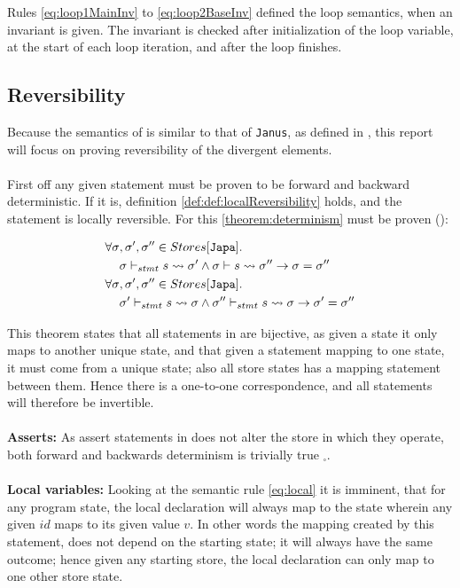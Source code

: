 Rules \eqref{eq:loop1MainInv} to \eqref{eq:loop2BaseInv} defined the loop semantics, when an
invariant is given. The invariant is checked after initialization of the loop variable, at
the start of each loop iteration, and after the loop finishes.

\subsection{Reversibility} \label{subsec:reversibility}
Because the semantics of \lan is similar to that of \texttt{Janus}, as defined in \cite{janus},
this report will focus on proving reversibility of the divergent elements.
\\
\\
First off any given statement must be proven to be forward and backward deterministic. If it is,
definition \autoref{def:def:localReversibility} holds, and the statement is locally reversible.
For this \autoref{theorem:determinism} must be proven (\cite{janus}):

\begin{theorem} \label{theorem:determinism}
    \begin{align*}
        \forall \sigma&, \sigma', \sigma''\in Stores[\texttt{Japa}]. \\
        &\sigma \vdash_{stmt} s \leadsto \sigma' \land \sigma \vdash s \leadsto \sigma''
            \rightarrow \sigma = \sigma'' \\
        \forall \sigma&, \sigma', \sigma''\in Stores[\texttt{Japa}]. \\
        &\sigma' \vdash_{stmt} s \leadsto \sigma \land \sigma'' \vdash_{stmt} s \leadsto \sigma
            \rightarrow \sigma' = \sigma''
    \end{align*}
\end{theorem}
\noindent
This theorem states that all statements in \lan are bijective, as given a state it only maps to
another unique state, and that given a statement mapping to one state, it must come from a
unique state; also all store states has a mapping statement between them.
Hence there is a one-to-one correspondence, and all statements will therefore be
invertible.
\\
\\
\textbf{Asserts:}
As assert statements in \lan does not alter the store in which they operate, both
forward and backwards determinism is trivially true $_\square$.
\\
\\
\textbf{Local variables:}
Looking at the semantic rule \eqref{eq:local} it is imminent, that for any program state,
the local declaration will always map to the state wherein any given $id$ maps to its given value
$v$. In other words the mapping created by this statement, does not depend on the starting state;
it will always have the same outcome; hence given any starting store, the local declaration can
only map to one other store state.

